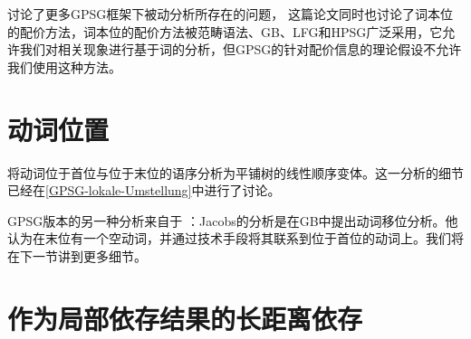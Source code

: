  \citet[--396]{Jacobson87b}讨论了更多GPSG框架下被动分析所存在的问题，
这篇论文同时也讨论了词本位的配价方法，词本位的配价方法被范畴语法、GB、LFG和HPSG广泛采用，它允许我们对相关现象进行基于词的分析，但GPSG的针对配价信息的理论假设不允许我们使用这种方法。

\section{动词位置}
\label{Abschnitt-Verbstellung-GPSG}

\mbox{}\citet{Uszkoreit87a}将动词位于首位与位于末位的语序分析为平铺树的线性顺序变体。这一分析的细节已经在\ref{GPSG-lokale-Umstellung}中进行了讨论。

GPSG版本的另一种分析来自于 \citet[]{Jacobs86a}：Jacobs的分析是在GB中提出动词移位分析。他认为在末位有一个空动词，并通过技术手段将其联系到位于首位的动词上。我们将在下一节讲到更多细节。

\section{作为局部依存结果的长距离依存}
\label{Abschnitt-GPSG-Fernabhaengigkeiten}\label{sec-nld-gpsg}

